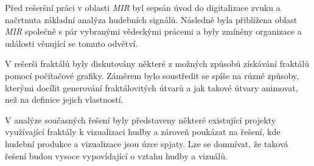 \documentclass[thesis=B, czech]{FITthesis}[2019/03/06]
\begin{document}



\begin{conclusion}


Před rešeršní práci v oblasti \textit{MIR} byl sepsán úvod do digitalizace zvuku a načrtnuta základní analýza hudebních signálů. Následně byla přiblížena oblast \textit{MIR} společně s pár vybranými vědeckými prácemi a byly zmíněny organizace a události věnující se tomuto odvětví.


V rešerši fraktálů byly diskutovány některé z možných způsobů získávání fraktálů pomocí počítačové grafiky. Záměrem bylo soustředit se spíše na různé způsoby, kterými docílit generování fraktálovitých útvarů a jak takové útvary animovat, než na definice jejich vlastností.

V analýze současných řešení byly představeny některé existující projekty využívající fraktály k vizualizaci hudby a zároveň poukázat na řešení, kde hudební produkce a vizualizace jsou úzce spjaty. Lze se domnívat, že taková řešení budou vysoce vypovídající o vztahu hudby a vizuálů.


\end{conclusion}
\end{document}
